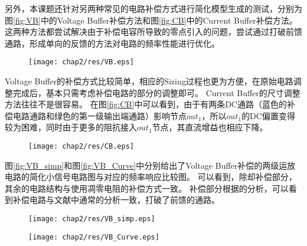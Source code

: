 另外，本课题还针对另两种常见的电路补偿方式进行简化模型生成的测试，分别为图\ref{fig:VB}中的Voltage Buffer补偿方法和图\ref{fig:CB}中的Current Buffer补偿方法。
这两种方法都尝试解决由于补偿电容所导致的零点引入的问题，尝试通过打破前馈通路，形成单向的反馈的方法对电路的频率性能进行优化。

\begin{figure}[!htp]
	\centering
	\texttt{[image: chap2/res/VB.eps]}
\end{figure}

Voltage Buffer的补偿方式比较简单，相应的Sizing过程也更为方便，在原始电路调整完成后，基本只需考虑补偿电路的部分的调整即可。
Current Buffer的尺寸调整方法往往不是很容易。
在图\ref{fig:CB}中可以看到，由于有两条DC通路（蓝色的补偿电路通路和绿色的第一级输出端通路）影响节点$out_1$，所以$out_1$的DC偏置变得较为困难，同时由于更多的阻抗接入$out_1$节点，其直流增益也相应下降。

\begin{figure}[!htp]
	\centering
	\texttt{[image: chap2/res/CB.eps]}
\end{figure}

图\ref{fig:VB_simp}和图\ref{fig:VB_Curve}中分别给出了Voltage Buffer补偿的两级运放电路的简化小信号电路图与对应的频率响应比较图。
可以看到，除却补偿部分，其余的电路结构与使用凋零电阻的补偿方式一致。
补偿部分根据\parencite{VB1,VB2}的分析，可以看到补偿电路与文献中通常的分析一致，打破了前馈的通路。

\begin{figure}[!htp]
	\centering
	\texttt{[image: chap2/res/VB\_simp.eps]}
\end{figure}

\begin{figure}[!htp]
	\centering
	\texttt{[image: chap2/res/VB\_Curve.eps]}
\end{figure}

